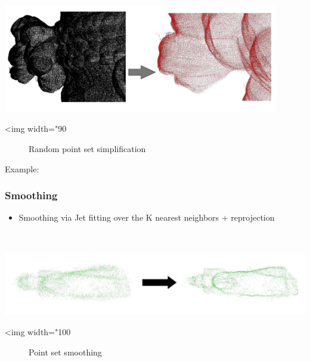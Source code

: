 \begin{center}
    \label{Surface_reconstruction_3-fig-random_simplification}
    \begin{ccTexOnly}
        \includegraphics[width=0.9\textwidth]{Surface_reconstruction_3/random_simplification} %
    \end{ccTexOnly}
    \begin{ccHtmlOnly}
        <img width="90%
    \end{ccHtmlOnly}
    \begin{figure}[h]
        \caption{Random point set simplification}
    \end{figure}
\end{center}

Example:



\subsubsection{Smoothing}

\begin{itemize}
\item Smoothing via Jet fitting over the K nearest neighbors + reprojection
\end{itemize}

  \\

\begin{center}
    \label{Surface_reconstruction_3-fig-jet_smoothing}
    \begin{ccTexOnly}
        \includegraphics[width=1.0\textwidth]{Surface_reconstruction_3/jet_smoothing} %
    \end{ccTexOnly}
    \begin{ccHtmlOnly}
        <img width="100%
    \end{ccHtmlOnly}
    \begin{figure}[h]
        \caption{Point set smoothing}
    \end{figure}
\end{center}

